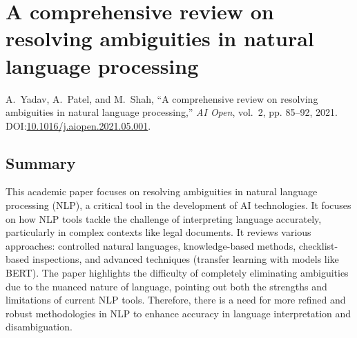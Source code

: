 
\section[Resolving ambiguities in NLP]{A comprehensive review on resolving ambiguities in natural language processing}






\begin{thebibliography}{1}

  A.~Yadav, A.~Patel, and M.~Shah, ``A comprehensive review on resolving ambiguities in natural language processing,'' \emph{AI Open}, vol.~2, pp. 85--92, 2021. DOI:\@ \href{https://doi.org/10.1016/j.aiopen.2021.05.001}{10.1016/j.aiopen.2021.05.001}.

\end{thebibliography}

\subsection{Summary}
This academic paper focuses on resolving ambiguities in natural language processing (NLP), a critical tool in the development of AI technologies. It focuses on how NLP tools tackle the challenge of interpreting language accurately, particularly in complex contexts like legal documents. It reviews various approaches: controlled natural languages, knowledge-based methods, checklist-based inspections, and advanced techniques (transfer learning with models like BERT). The paper highlights the difficulty of completely eliminating ambiguities due to the nuanced nature of language, pointing out both the strengths and limitations of current NLP tools. Therefore, there is a need for more refined and robust methodologies in NLP to enhance accuracy in language interpretation and disambiguation.
